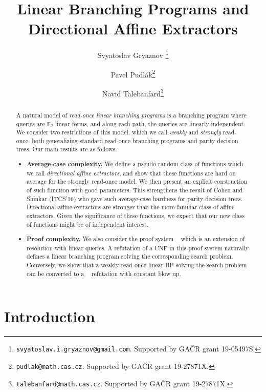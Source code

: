 \documentclass[a4paper,11pt,draft]{article}
\title{Linear Branching Programs and Directional Affine Extractors}
\author[1]{Svyatoslav Gryaznov \footnote{{\tt svyatoslav.i.gryaznov@gmail.com}. Supported by GA{\v C}R grant 19-05497S.}}
\author[2]{Pavel Pudl\'{a}k\footnote{{\tt pudlak@math.cas.cz}. Supported by GA{\v C}R grant 19-27871X.}}
\author[2]{Navid Talebanfard\footnote{{\tt talebanfard@math.cas.cz}. Supported by GA{\v C}R grant 19-27871X.}}
\affil[1]{St. Petersburg Department of V. A. Steklov Institute of Mathematics of the Russian Academy of Sciences}
\affil[2]{Institute of Mathematics, Czech Academy of Sciences}
\date{}
\theoremstyle{definition}
\theoremstyle{remark}
\DeclareMathOperator{\reslin}{\mathsf{Res}[\oplus]}
\newcommand{\bbF}{\mathbb{F}}
\newcommand{\sreadonce}{strongly read-once}
\newcommand{\wreadonce}{weakly read-once}
\newcommand{\readonce}{read-once}
\begin{document}
\maketitle




\begin{abstract}

A natural model of \emph{\readonce{} linear branching programs} is a branching program where queries are $\bbF_2$ linear forms, and along each path, the queries are linearly independent. We consider two restrictions of this model, which we call \emph{weakly} and \emph{strongly} read-once, both generalizing standard read-once branching programs and parity decision trees. Our main results are as follows.

\begin{itemize}
    \item {\bf Average-case complexity.} We define a pseudo-random class of functions which we call \emph{directional affine extractors}, and show that these functions are hard on average for the \sreadonce{} model. We then present an explicit construction of such function with good parameters. This strengthens the result of Cohen and Shinkar (ITCS'16) who gave such average-case hardness for parity decision trees. Directional affine extractors are stronger than the more familiar class of affine extractors. Given the significance of these functions, we expect that our new class of functions might be of independent interest.

    \item {\bf Proof complexity.} We also consider the proof system $\reslin$ which is an extension of resolution with linear queries. A refutation of a CNF in this proof system naturally defines a linear branching program solving the corresponding search problem. Conversely, we show that a \wreadonce{} linear BP solving the search problem can be converted to a $\reslin$ refutation with constant blow up.
\end{itemize}



\end{abstract}


\section{Introduction}
\end{document}
